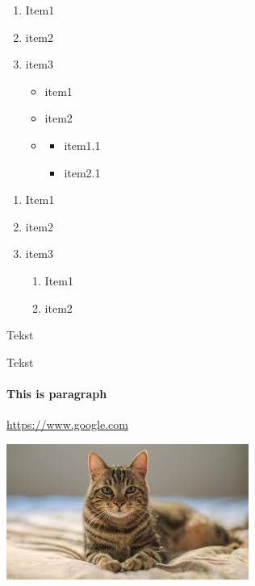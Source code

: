 \documentclass{report}
\begin{document}
    \begin{enumerate}
        \item Item1
        \item item2 
        \item item3 
            \begin{itemize}
                \item item1
                \item item2
                \item \begin{itemize}
                        \item item1.1
                        \item item2.1
                    \end{itemize}
            \end{itemize}
    \end{enumerate}
    \begin{enumerate}
        \item Item1
        \item item2
        \item item3 \begin{enumerate}
                \item Item1
                \item item2
            \end{enumerate}
    \end{enumerate}

    Tekst

    Tekst



    
    \paragraph{This is paragraph}
    \url{https://www.google.com}

    \includegraphics{../cat.jpg}
\end{document}
